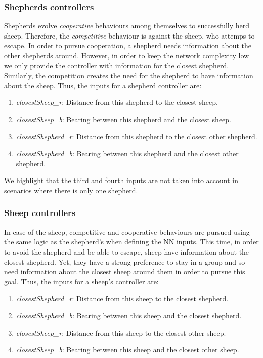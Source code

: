 \documentclass[conference]{IEEEtran}
\begin{document}
\vspace{0.5em}
\subsubsection{Shepherds controllers}
Shepherds evolve \textit{cooperative} behaviours among themselves to successfully herd sheep.
Therefore, the \textit{competitive} behaviour is against the sheep, who attemps to escape. 
In order to pursue cooperation, a shepherd needs information about the other shepherds around. 
However, in order to keep the network complexity low we only provide the controller with information for the closest shepherd. 
Similarly, the competition creates the need for the shepherd to have information about the sheep.
Thus, the inputs for a shepherd controller are: 

\begin{enumerate}
	\item \textit{closestSheep\_r}: Distance from this shepherd to the closest sheep.
	\item \textit{closestSheep\_b}: Bearing between this shepherd and the closest sheep. 
	\item \textit{closestShepherd\_r}: Distance from this shepherd to the closest other shepherd.
	\item \textit{closestShepherd\_b}: Bearing between this shepherd and the closest other shepherd.
\end{enumerate}

We highlight that the third and fourth inputs are not taken into account in scenarios where there is only one shepherd. 

\vspace{0.5em}
\subsubsection{Sheep controllers}
In case of the sheep, competitive and cooperative behaviours are pursued using the same logic as the shepherd's when defining the NN inputs. 
This time, in order to avoid the shepherd and be able to escape, sheep have information about the closest shepherd. 
Yet, they have a strong preference to stay in a group and so need information about the closest sheep around them in order to pursue this goal. 
Thus, the inputs for a sheep's controller are:

\begin{enumerate}
	\item \textit{closestShepherd\_r}: Distance from this sheep to the closest shepherd.
	\item \textit{closestShepherd\_b}: Bearing between this sheep and the closest shepherd.
	\item \textit{closestSheep\_r}: Distance from this sheep to the closest other sheep.
	\item \textit{closestSheep\_b}: Bearing between this sheep and the closest other sheep.
\end{enumerate}
\end{document}
